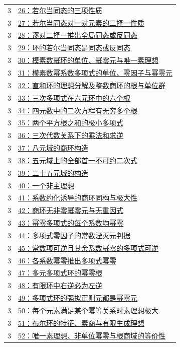 \documentclass[UTF8,a4paper,11pt,fontset=windows]{ctexart}
\begin{document}
\begin{longtable}{cp{13.5cm}}
3 & \hyperref[ex:3:26]{26：若尔当同态的三项性质}\\
3 & \hyperref[ex:3:27]{27：若尔当同态对一对元素的二择一性质}\\
3 & \hyperref[ex:3:28]{28：逐对二择一推出全局同态或反同态}\\
3 & \hyperref[ex:3:29]{29：环的若尔当同态是同态或反同态}\\
3 & \hyperref[ex:3:30]{30：模素数幂环的单位、幂零元与唯一素理想}\\
3 & \hyperref[ex:3:31]{31：模素数幂系数多项式的单位、零因子与幂零元}\\
3 & \hyperref[ex:3:32]{32：直和环的理想分解及整数商环的根与单位群}\\
3 & \hyperref[ex:3:33]{33：三次多项式在六元环中的六个根}\\
3 & \hyperref[ex:3:34]{34：四元数中的二次方程有无穷多个根}\\
3 & \hyperref[ex:3:35]{35：两个平方根之和的极小多项式}\\
3 & \hyperref[ex:3:36]{36：三次代数关系下的乘法和求逆}\\
3 & \hyperref[ex:3:37]{37：八元域的商环构造}\\
3 & \hyperref[ex:3:38]{38：五元域上的全部首一不可约二次式}\\
3 & \hyperref[ex:3:39]{39：二十五元域的构造}\\
3 & \hyperref[ex:3:40]{40：一个非主理想}\\
3 & \hyperref[ex:3:41]{41：系数约化诱导的商环同构与极大性}\\
3 & \hyperref[ex:3:42]{42：商环无非零幂零元与无重因式}\\
3 & \hyperref[ex:3:43]{43：幂零多项式的每个系数均幂零}\\
3 & \hyperref[ex:3:44]{44：多项式零因子的常数湮灭元判据}\\
3 & \hyperref[ex:3:45]{45：常数项可逆且其余系数幂零的多项式可逆}\\
3 & \hyperref[ex:3:46]{46：各系数幂零推出多项式幂零}\\
3 & \hyperref[ex:3:47]{47：多元多项式环的幂零根}\\
3 & \hyperref[ex:3:48]{48：有限环中右逆必为左逆}\\
3 & \hyperref[ex:3:49]{49：多项式环的强拟正则元都是幂零元}\\
3 & \hyperref[ex:3:50]{50：每个元素满足某个幂等关系时素理想极大}\\
3 & \hyperref[ex:3:51]{51：布尔环的特征、素商与有限生成理想}\\
3 & \hyperref[ex:3:52]{52：唯一素理想、非单位幂零与根商域的等价性}\\

\end{longtable}
\end{document}
